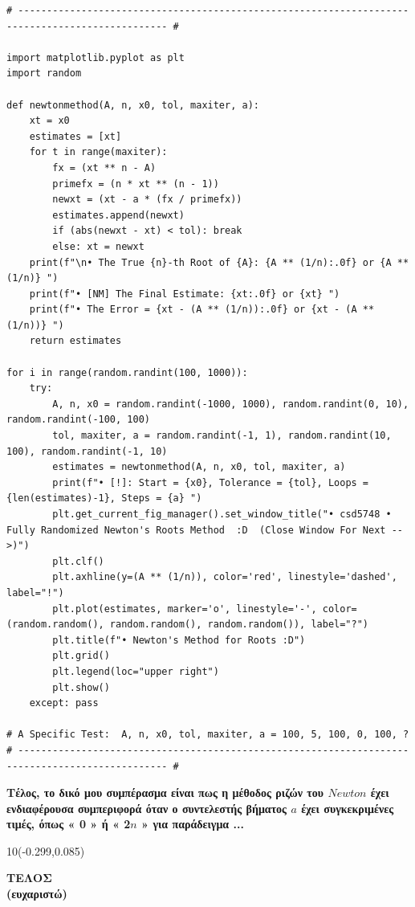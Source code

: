 \documentclass[a4paper]{article}
\begin{document}
\vspace{0.75cm}
\begin{verbatim}
# ------------------------------------------------------------------------------------------------ #

import matplotlib.pyplot as plt
import random

def newtonmethod(A, n, x0, tol, maxiter, a):
    xt = x0
    estimates = [xt]
    for t in range(maxiter):
        fx = (xt ** n - A)
        primefx = (n * xt ** (n - 1))
        newxt = (xt - a * (fx / primefx))
        estimates.append(newxt)
        if (abs(newxt - xt) < tol): break
        else: xt = newxt
    print(f"\n• The True {n}-th Root of {A}: {A ** (1/n):.0f} or {A ** (1/n)} ")
    print(f"• [NM] The Final Estimate: {xt:.0f} or {xt} ")
    print(f"• The Error = {xt - (A ** (1/n)):.0f} or {xt - (A ** (1/n))} ")
    return estimates

for i in range(random.randint(100, 1000)):
    try:
        A, n, x0 = random.randint(-1000, 1000), random.randint(0, 10), random.randint(-100, 100)
        tol, maxiter, a = random.randint(-1, 1), random.randint(10, 100), random.randint(-1, 10)
        estimates = newtonmethod(A, n, x0, tol, maxiter, a)
        print(f"• [!]: Start = {x0}, Tolerance = {tol}, Loops = {len(estimates)-1}, Steps = {a} ")
        plt.get_current_fig_manager().set_window_title("• csd5748 • Fully Randomized Newton's Roots Method  :D  (Close Window For Next -->)")
        plt.clf()
        plt.axhline(y=(A ** (1/n)), color='red', linestyle='dashed', label="!")
        plt.plot(estimates, marker='o', linestyle='-', color=(random.random(), random.random(), random.random()), label="?")
        plt.title(f"• Newton's Method for Roots :D")
        plt.grid()
        plt.legend(loc="upper right")
        plt.show()
    except: pass

# A Specific Test:  A, n, x0, tol, maxiter, a = 100, 5, 100, 0, 100, ?
# ------------------------------------------------------------------------------------------------ #
\end{verbatim}

\vspace{1cm}
\textbf{Τέλος, το δικό μου συμπέρασμα είναι πως η μέθοδος ριζών του \(Newton\) έχει ενδιαφέρουσα συμπεριφορά όταν ο συντελεστής βήματος \(a\) έχει συγκεκριμένες τιμές, όπως « 0 » ή « 2\(n\) » για παράδειγμα ...}



\newpage

\begin{textblock}{10}(-0.299,0.085)
    \boxed{\textbf{\LaTeX{}}}
\end{textblock}

\begin{center}
    \vspace*{\fill}
    \textbf{\LARGE{ΤΕΛΟΣ}} \\[0.001cm]
    \textbf{(ευχαριστώ)}
    \\[5cm]
    \vspace*{\fill}
\end{center}
\end{document}
